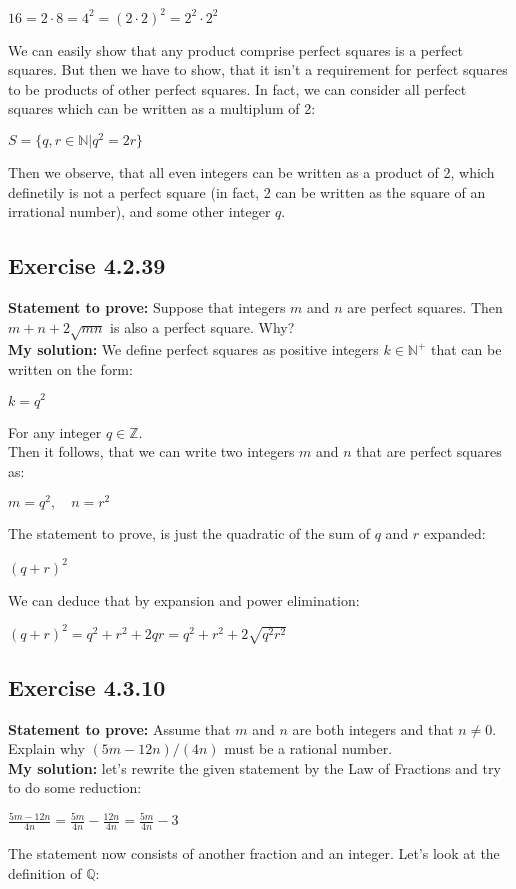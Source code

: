 \documentclass{article}
\newcommand{\cent}[1]{\begin{center}#1\end{center}}
\newcommand{\doubleZ}{\mathbb{Z}}
\newcommand{\doubleN}{\mathbb{N}}
\newcommand{\doubleQ}{\mathbb{Q}}
\newcommand{\Prove}{\textbf{Statement to prove: }}
\newcommand{\Solution}{\textbf{My solution: }}
\newcommand{\QED}{\boxed{}}
\newcommand{\Exercise}[1]{\subsection{Exercise #1}}
\begin{document}
	\cent{$16 = 2 \cdot 8 = 4^2 = (2 \cdot 2)^2 = 2^2 \cdot 2^2$}
	
	We can easily show that any product comprise perfect squares is a perfect squares. But then we have to show, that it isn't a requirement for perfect squares to be products of other perfect squares. In fact, we can consider all perfect squares which can be written as a multiplum of 2:
	
	\cent{$S = \{q,r \in \doubleN | q^2 = 2r\}$}
	
	Then we observe, that all even integers can be written as  a product of 2, which definetily is not a perfect square (in fact, 2 can be written as the square of an irrational number), and some other integer $q$.\\
	\QED
	
	\Exercise{4.2.39}
	
	\Prove
	Suppose that integers $m$ and $n$ are perfect squares. Then $m+n+2\sqrt{mn}$ is also a perfect square. Why?\\
	
	\Solution
	We define perfect squares as positive integers $k \in \doubleN^+$ that can be written on the form:
	
 	\cent{$k = q^2$}
 	
 	For any integer $q \in \doubleZ$.\\
 	
 	Then it follows, that we can write two integers $m$ and $n$ that are perfect squares as:
 	
 	\cent{$m = q^2, \quad n = r^2$}
	
	The statement to prove, is just the quadratic of the sum of $q$ and $r$ expanded:
	 \cent{$(q+r)^2$} 
	 
	 We can deduce that by expansion and power elimination:
	 
	\cent{$(q+r)^2 = q^2+r^2 + 2qr =q^2+r^2 + 2\sqrt{q^2 r^2} $}
	
	\QED	 
	
	\Exercise{4.3.10}
	
	\Prove
	Assume that $m$ and $n$ are both integers and that  $n\neq 0$. Explain why $(5m -12n)/(4n)$ must be a rational number.\\
	
	\Solution
	let's rewrite the given statement by the Law of Fractions and try to do some reduction:
	
	\cent{$\frac{5m-12n}{4n} = \frac{5m}{4n} - \frac{12n}{4n} = \frac{5m}{4n} - 3 $}
	
	The statement now consists of another fraction and an integer. Let's look at the definition of $\doubleQ$:
	
\end{document}
